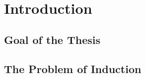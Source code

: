 
\section{Introduction}
\label{sec:introduction}

\subsection{Goal of the Thesis}

\subsection{The Problem of Induction}
